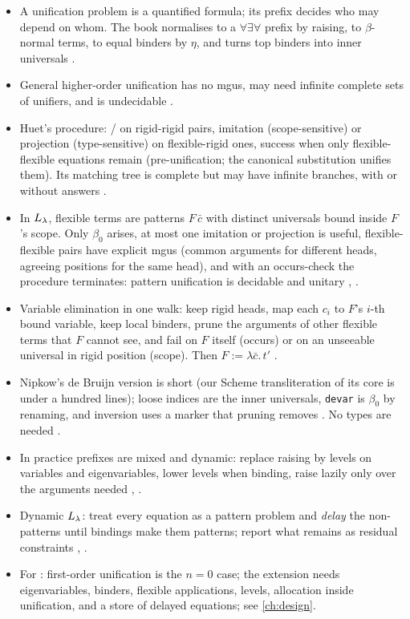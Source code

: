 \begin{itemize}\emergencystretch=2em
  \item A unification problem is a quantified formula; its prefix decides who may depend on whom. The book
    normalises to a $\forall\exists\forall$ prefix by raising, to $\beta$-normal terms, to equal binders by $\eta$, and turns
    top binders into inner universals .
  \item General higher-order unification has no mgus, may need infinite complete sets of unifiers, and is
    undecidable .
  \item Huet's procedure: /\allowbreak{} on rigid-rigid pairs, imitation (scope-sensitive) or
    projection (type-sensitive) on flexible-rigid ones, success when only flexible-flexible equations remain
    (pre-unification; the canonical substitution unifies them). Its matching tree is complete but may have infinite
    branches, with or without answers .
  \item In $L_\lambda$, flexible terms are patterns $F\,\bar c$ with distinct universals bound inside $F$'s scope. Only
    $\beta_0$ arises, at most one imitation or projection is useful, flexible-flexible pairs have explicit mgus
    (common arguments for different heads, agreeing positions for the same head), and with an occurs-check the
    procedure terminates: pattern unification is decidable and unitary , \cite{Miller1991}.
  \item Variable elimination in one walk: keep rigid heads, map each $c_i$ to $F$'s $i$-th bound variable, keep local
    binders, prune the arguments of other flexible terms that $F$ cannot see, and fail on $F$ itself (occurs) or on an
    unseeable universal in rigid position (scope). Then $F:=\lambda\bar c.\,t'$ .
  \item Nipkow's de Bruijn version is short (our Scheme transliteration of its core is under a hundred lines); loose indices are the inner universals, \texttt{devar}
    is $\beta_0$ by renaming, and inversion uses a marker that pruning removes \cite{Nipkow1993}. No types are needed
    .
  \item In practice prefixes are mixed and dynamic: replace raising by levels on variables and eigenvariables,
    lower levels when binding, raise lazily only over the arguments needed ,
    \cite{NadathurJayaramanKwon1995,NadathurLinnell2005,DunchevEtAl2015}.
  \item Dynamic $L_\lambda$: treat every equation as a pattern problem and \emph{delay} the non-patterns until bindings
    make them patterns; report what remains as residual constraints ,
    \cite{DowekHardinKirchnerPfenning1996}.
  \item For \micro{}: first-order unification is the $n=0$ case; the extension needs eigenvariables, binders,
    flexible applications, levels, allocation inside unification, and a store of delayed equations; see
    \cref{ch:design}.
\end{itemize}
